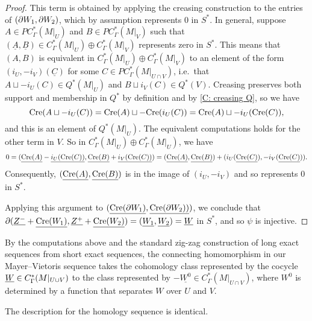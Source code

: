\begin{proof}
    This term is obtained by applying the creasing construction to the entries of $(\partial W_1,\partial W_2)$, which by assumption represents $0$ in $S^*$.
	In general, suppose $A \in PC^*_{\Gamma}(M|_U)$ and $B \in PC^*_\Gamma(M|_V)$ such that $(\underline{A}, \underline{B}) \in C^*_\Gamma(M|_U) \oplus C^*_\Gamma(M|_V)$ represents zero in $S^*$.
	This means that $(A,B)$ is equivalent in $C^*_\Gamma(M|_U) \oplus C^*_\Gamma(M|_V)$ to an element of the form $(i_U,-i_V)(\underline{C})$ for some $C \in PC^*_{\Gamma}(M|_{U \cap V})$, i.e.\ that $A \sqcup -i_U(C) \in Q^*(M|_U)$ and $B \sqcup i_V(C) \in Q^*(V)$.
	Creasing preserves both support and membership in $Q^*$ by definition and by \cref{C: creasing Q}, so we have
	$$\mathrm{Cre}(A \sqcup -i_U(C)) = \mathrm{Cre}(A) \sqcup -\mathrm{Cre}(i_U(C)) = \mathrm{Cre}(A) \sqcup -i_U(\mathrm{Cre}(C)),$$
	and this is an element of $Q^*(M|_U)$.
	The equivalent computations holds for the other term in $V$.
	So in $C^*_\Gamma(M|_U)\oplus C^*_\Gamma(M|_U)$, we have
    $$0= (\underline{\mathrm{Cre}(A)} -\underline{i_U(\mathrm{Cre}(C))}, \underline{\mathrm{Cre}(B)} + \underline{i_V(\mathrm{Cre}(C))}) = (\underline{\mathrm{Cre}(A)},\underline{\mathrm{Cre}(B)}) +(i_U(\underline{\mathrm{Cre}(C)}), -i_V(\underline{\mathrm{Cre}(C)})).$$
	Consequently, $(\underline{\mathrm{Cre}(A)},\underline{\mathrm{Cre}(B)})$ is in the image of $(i_U, -i_V)$ and so represents $0$ in $S^*$.

	Applying this argument to $(\underline{\mathrm{Cre}(\partial W_1)},\underline{\mathrm{Cre}(\partial W_2))})$, we conclude that
	$\partial (\underline{Z^-} + \underline{\mathrm{Cre}(W_1)},\underline{Z^+} + \underline{\mathrm{Cre}(W_2)}) = (\underline{W_1},\underline{W_2}) = \underline{W}$ in $S^*$, and so $\psi$ is injective.
\end{proof}

\begin{remark}\label{R: MV boundary}
	By the computations above and the standard zig-zag construction of long exact sequences from short exact sequences, the connecting homomorphism in our Mayer--Vietoris sequence takes the cohomology class represented by the cocycle $\underline{W} \in C^*_\Gamma(M|_{U \cup V})$ to the class represented by $-\underline{W^0} \in C^*_\Gamma(M|_{U \cap V})$, where $W^0$ is determined by a function that separates $W$ over $U$ and $V$.

	The description for the homology sequence is identical.
\end{remark}

